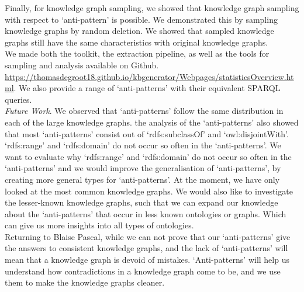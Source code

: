\documentclass[11pt,letterpaper ,oneside ]{book}
\begin{document}
	Finally, for knowledge graph sampling, we showed that knowledge graph sampling with respect to `anti-pattern' is possible. We demonstrated this by sampling knowledge graphs by random deletion. We showed that sampled knowledge graphs still have the same characteristics with original knowledge graphs.\\
	
	We made both the toolkit, the extraction pipeline, as well as the tools for sampling and analysis available on Github. \\ \url{https://thomasdegroot18.github.io/kbgenerator/Webpages/statisticsOverview.html}. We also provide a range of `anti-patterns' with their equivalent SPARQL queries.\\
	\textit{Future Work}. We observed that `anti-patterns' follow the same distribution in each of the large knowledge graphs. the analysis of the `anti-patterns' also showed that most `anti-patterns' consist out of `rdfs:subclassOf' and `owl:disjointWith'. `rdfs:range' and `rdfs:domain' do not occur so often in the `anti-patterns'.
	We want to evaluate why `rdfs:range' and `rdfs:domain' do not occur so often in the `anti-patterns' and we would improve the generalisation of `anti-patterns', by creating more general types for `anti-patterns'. At the moment, we have only looked at the most common knowledge graphs. We would also like to investigate the lesser-known knowledge graphs, such that we can expand our knowledge about the `anti-patterns' that occur in less known ontologies or graphs. Which can give us more insights into all types of ontologies.\\
	
	Returning to Blaise Pascal, while we can not prove that our `anti-patterns' give the answers to consistent knowledge graphs, and the lack of `anti-patterns' will mean that a knowledge graph is devoid of mistakes. `Anti-patterns' will help us understand how contradictions in a knowledge graph come to be, and we use them to make the knowledge graphs cleaner.
	
	\newpage
	
	
	
	
\end{document}
